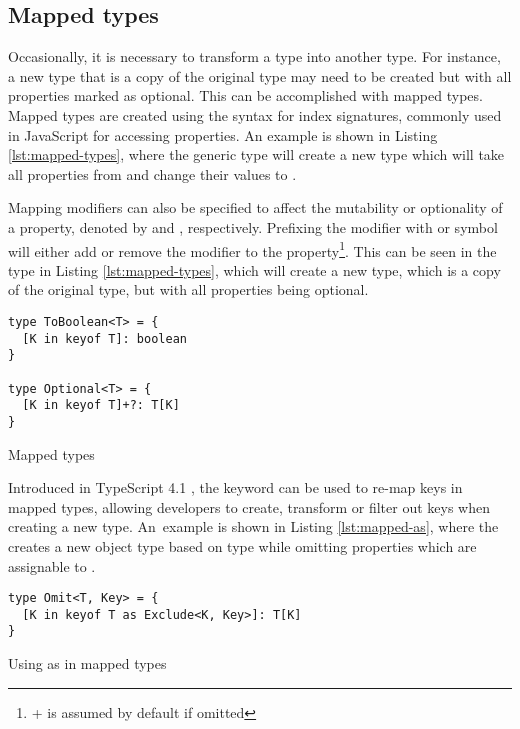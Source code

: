 \subsection{Mapped types}\label{sec:mapped-types}

Occasionally, it is necessary to transform a type into another type. For instance, a new type that is a copy of the original type may need to be created but with all properties marked as optional. This can be accomplished with mapped types. Mapped types are created using the syntax for index signatures, commonly used in JavaScript for accessing properties. An example is shown in Listing \ref{lst:mapped-types}, where the generic type  will create a new type which will take all properties from  and change their values to .

Mapping modifiers can also be specified to affect the mutability or optionality of a property, denoted by  and , respectively. Prefixing the modifier with \code{+} or \code{-} symbol will either add or remove the modifier to the property\footnote{+ is assumed by default if omitted}. This can be seen in the  type in Listing \ref{lst:mapped-types}, which will create a new type, which is a copy of the original type, but with all properties being optional.

\begin{listing}[ht]
  \begin{verbatim}
type ToBoolean<T> = {
  [K in keyof T]: boolean
}

type Optional<T> = {
  [K in keyof T]+?: T[K]
}
\end{verbatim}
  \caption{Mapped types}\label{lst:mapped-types}
\end{listing}

Introduced in TypeScript 4.1 \cite{AnnouncingTypeScript4.1}, the  keyword can be used to re-map keys in mapped types, allowing developers to create, transform or filter out keys when creating a new type. An~example is shown in Listing \ref{lst:mapped-as}, where the  creates a new object type based on type  while omitting properties which are assignable to .

\begin{listing}[ht]
  \begin{verbatim}
type Omit<T, Key> = {
  [K in keyof T as Exclude<K, Key>]: T[K]
}
\end{verbatim}
  \caption{Using as in mapped types}\label{lst:mapped-as}
\end{listing}

